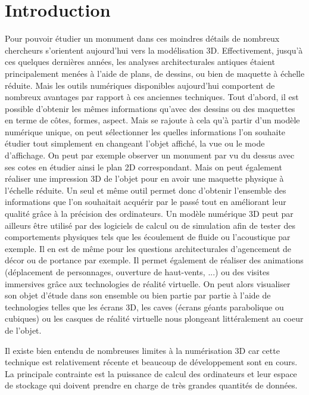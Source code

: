 		\section{Introduction}
		Pour pouvoir étudier un monument dans ces moindres détails de nombreux chercheurs s'orientent aujourd'hui vers la modélisation 3D. Effectivement, jusqu'à ces quelques dernières années, les analyses architecturales antiques étaient principalement menées à l'aide de plans, de dessins, ou bien de maquette à échelle réduite. Mais les outils numériques disponibles aujourd'hui comportent de nombreux avantages par rapport à ces anciennes techniques. Tout d'abord, il est possible d'obtenir les mêmes informations qu'avec des dessins ou des maquettes en terme de côtes, formes, aspect. Mais se rajoute à cela qu'à partir d'un modèle numérique unique, on peut sélectionner les quelles informations l'on souhaite étudier tout simplement en changeant l'objet affiché, la vue ou le mode d'affichage. On peut par exemple observer un monument par vu du dessus avec ses cotes en étudier ainsi le plan 2D correspondant. Mais on peut également réaliser une impression 3D de l'objet pour en avoir une maquette physique à l'échelle réduite. Un seul et même outil permet donc d'obtenir l'ensemble des informations que l'on souhaitait acquérir par le passé tout en améliorant leur qualité grâce à la précision des ordinateurs. Un modèle numérique 3D peut par ailleurs être utilisé par des logiciels de calcul ou de simulation afin de tester des comportements physiques tels que les écoulement de fluide ou l'acoustique par exemple. Il en est de même pour les questions architecturales d'agencement de décor ou de portance par exemple. Il permet également de réaliser des animations (déplacement de personnages, ouverture de haut-vents, ...) ou des visites immersives grâce aux technologies de réalité virtuelle. On peut alors visualiser son objet d'étude dans son ensemble ou bien partie par partie à l'aide de technologies telles que les écrans 3D, les caves (écrans géants parabolique ou cubiques) ou les casques de réalité virtuelle nous plongeant littéralement au coeur de l'objet.

Il existe bien entendu de nombreuses limites à la numérisation 3D car cette technique est relativement récente et beaucoup de développement sont en cours. La principale contrainte est la puissance de calcul des ordinateurs et leur espace de stockage qui doivent prendre en charge de très grandes quantités de données.

